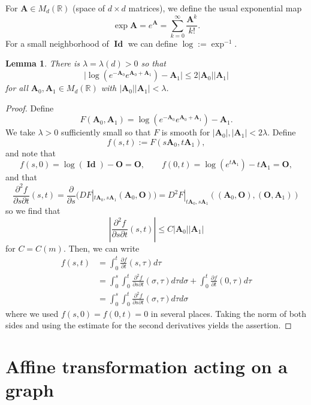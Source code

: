 \documentclass[11pt, letterpaper, reqno]{amsart}
\numberwithin{equation}{section}
\newtheorem{Lem}[Def]{Lemma}
\theoremstyle{remark}
\newcommand{\RR}{\mathbb{R}}
\newcommand{\mbfA}{\mathbf{A}}
\begin{document}
For $\mbfA \in M_d(\RR)$ (space of $d\times d$ matrices), we define the usual exponential map
\[ \exp \mbfA = e^\mbfA = \sum_{k=0}^\infty \frac{\mbfA^k}{k!}. \]
For a small neighborhood of $\operatorname{\textbf{Id}}$ we can define $\log := \exp^{-1}$. 
\begin{Lem}\label{Lem:exp-addition-vs-mult-matrices}
There is $\lambda = \lambda(d) >0$ so that
\[ \vert\log (e^{-\mbfA_0} e^{\mbfA_0+\mbfA_1}) - \mbfA_1\vert \leq 2\vert\mbfA_0\vert\vert\mbfA_1\vert \]
for all $\mbfA_0,\mbfA_1 \in M_d(\RR)$ with $\vert\mbfA_0\vert\vert\mbfA_1\vert < \lambda$.
\end{Lem}
\begin{proof}
Define 
\[
F(\mbfA_0,\mbfA_1) = \log (e^{-\mbfA_0} e^{\mbfA_0+\mbfA_1}) - \mbfA_1.
\]
We take $\lambda >0$ sufficiently small so that $F$ is smooth for $\vert\mbfA_0\vert,\vert\mbfA_1\vert < 2\lambda$. Define
\[ f(s,t) := F(s\mbfA_0,t\mbfA_1), \]
and note that
\[
f(s,0) = \log (\operatorname{\mathbf{Id}}) - \mathbf{O} = \mathbf{O}, \qquad f(0,t) = \log(e^{t\mbfA_1}) - t\mbfA_1 = \mathbf{O},
\]
and that
\[
\frac{\partial^2f}{\partial s \partial t}(s,t) = \frac{\partial}{\partial s}(DF|_{t\mbfA_0,s\mbfA_1}(\mbfA_0,\mathbf{O})) = D^2F|_{t\mbfA_0,s\mbfA_1}((\mbfA_0,\mathbf{O}),(\mathbf{O},\mbfA_1))
\]
so we find that 
\[
\left\vert \frac{\partial^2f}{\partial s \partial t}(s,t) \right\vert \leq C \vert\mbfA_0\vert\vert\mbfA_1\vert
\]
for $C=C(m)$. Then, we can write
\begin{align*}
f(s,t) & = \int_0^t \frac{\partial f}{\partial t}(s,\tau) d\tau\\
& = \int_0^s \int_0^t \frac{\partial^2 f}{\partial s\partial t}(\sigma,\tau) d\tau d\sigma + \int_0^t \frac{\partial f}{\partial t}(0,\tau) d\tau\\
& = \int_0^s \int_0^t \frac{\partial^2 f}{\partial s\partial t}(\sigma,\tau) d\tau d\sigma 
\end{align*}
where we used $f(s,0) = f(0,t) = 0$ in several places. Taking the norm of both sides and using the estimate for the second derivatives yields the assertion. 
\end{proof}


\section{Affine transformation acting on a graph} 
\end{document}
